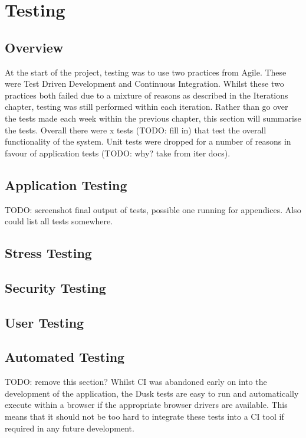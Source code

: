 \chapter{Testing}

\section{Overview}
At the start of the project, testing was to use two practices from Agile. These were Test Driven Development and Continuous Integration. Whilst these two practices both failed due to a mixture of reasons as described in the Iterations chapter, testing was still performed within each iteration. Rather than go over the tests made each week within the previous chapter, this section will summarise the tests. Overall there were x tests (TODO: fill in) that test the overall functionality of the system. Unit tests were dropped for a number of reasons in favour of application tests (TODO: why? take from iter docs).

\section{Application Testing}
TODO: screenshot final output of tests, possible one running for appendices. Also could list all tests somewhere.

\section{Stress Testing}


\section{Security Testing}


\section{User Testing}

\section{Automated Testing}
TODO: remove this section?
Whilst CI was abandoned early on into the development of the application, the Dusk tests are easy to run and automatically execute within a browser if the appropriate browser drivers are available. This means that it should not be too hard to integrate these tests into a CI tool if required in any future development.
